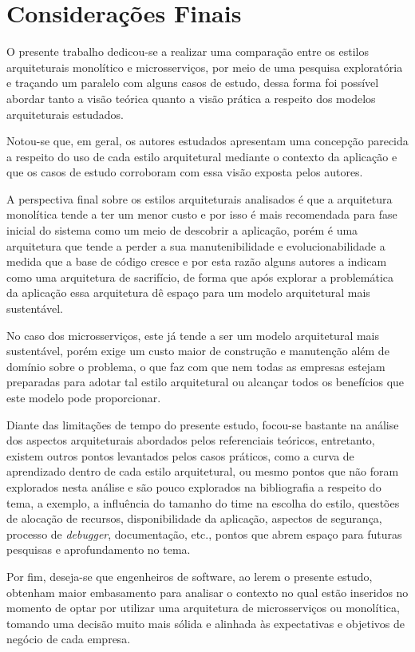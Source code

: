 \chapter{Considerações Finais}

O presente trabalho dedicou-se a realizar uma comparação entre os estilos arquiteturais monolítico e
microsserviços, por meio de uma pesquisa exploratória e traçando um paralelo com alguns casos de
estudo, dessa forma foi possível abordar tanto a visão teórica quanto a visão prática a respeito dos
modelos arquiteturais estudados.

Notou-se que, em geral, os autores estudados apresentam uma concepção parecida a respeito do
uso de cada estilo arquitetural mediante o contexto da aplicação e que os casos de estudo
corroboram com essa visão exposta pelos autores.

A perspectiva final sobre os estilos arquiteturais analisados é que a arquitetura monolítica tende a
ter um menor custo e por isso é mais recomendada para fase inicial do sistema como um meio de
descobrir a aplicação, porém é uma arquitetura que tende a perder a sua manutenibilidade e
evolucionabilidade a medida que a base de código cresce e por esta razão alguns autores a indicam como uma
arquitetura de sacrifício, de forma que após explorar a problemática da aplicação essa arquitetura
dê espaço para um modelo arquitetural mais sustentável.

No caso dos microsserviços, este já tende a ser um modelo arquitetural mais sustentável, porém exige
um custo maior de construção e manutenção além de domínio sobre o problema, o que faz com que nem todas
as empresas estejam preparadas para adotar tal estilo arquitetural ou alcançar todos os benefícios
que este modelo pode proporcionar.

Diante das limitações de tempo do presente estudo, focou-se bastante na análise dos aspectos
arquiteturais abordados pelos referenciais teóricos, entretanto, existem outros pontos levantados
pelos casos práticos, como a curva de aprendizado dentro de cada estilo arquitetural, ou mesmo pontos que
não foram explorados nesta análise e são pouco explorados na bibliografia a respeito do tema, a exemplo,
a influência do tamanho do time na escolha do estilo, questões de alocação de recursos, disponibilidade
da aplicação, aspectos de segurança, processo de \textit{debugger}, documentação, etc., pontos que abrem
espaço para futuras pesquisas e aprofundamento no tema.

Por fim, deseja-se que engenheiros de software, ao lerem o presente estudo, obtenham maior embasamento
para analisar o contexto no qual estão inseridos no momento de optar por utilizar uma arquitetura de
microsserviços ou monolítica, tomando uma decisão muito mais sólida e alinhada às expectativas e objetivos
de negócio de cada empresa.
